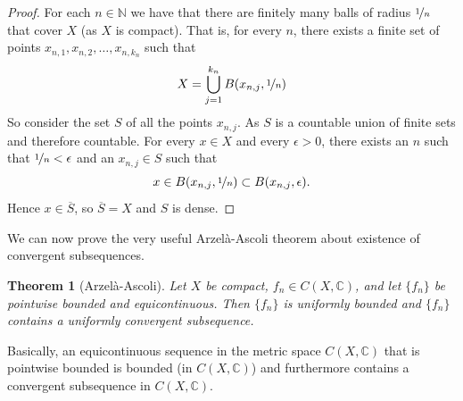 \documentclass[12pt]{book}
\newcommand{\C}{{\mathbb{C}}}
\newcommand{\N}{{\mathbb{N}}}
\theoremstyle{plain}
\newtheorem{thm}{Theorem}[section]
\theoremstyle{remark}
\theoremstyle{definition}
\theoremstyle{exercise}
\theoremstyle{example}
\begin{document}
\begin{proof}
For each $n \in \N$ we have that there are finitely many
balls of radius $\nicefrac{1}{n}$ that cover $X$ (as $X$ is compact). That is,
for every $n$, there exists
a finite set of points $x_{n,1},x_{n,2},\ldots,x_{n,k_n}$ such that
$$
X= \bigcup_{j=1}^{k_n} B(x_{n,j},\nicefrac{1}{n})
$$
So consider the set $S$ of all the points $x_{n,j}$.  As $S$ is a countable
union of finite sets and therefore countable.  For every $x \in X$
and every $\epsilon > 0$, there exists an $n$ such that
$\nicefrac{1}{n} < \epsilon$ and an $x_{n,j} \in S$ such that
$$
x \in B(x_{n,j},\nicefrac{1}{n}) \subset B(x_{n,j},\epsilon) .
$$
Hence $x \in \overline{S}$, so $\overline{S} = X$ and $S$ is dense.
\end{proof}

We can now prove the very useful Arzel\`a-Ascoli theorem about existence
of convergent subsequences.

\begin{thm}[Arzel\`a-Ascoli]
Let $X$ be compact, $f_n \in C(X,\C)$, and let $\{ f_n \}$
be pointwise bounded and equicontinuous.  Then
$\{f_n\}$ is uniformly bounded and $\{ f_n \}$ contains a uniformly
convergent subsequence.
\end{thm}

Basically, an equicontinuous sequence in the metric space
$C(X,\C)$ that is pointwise bounded
is bounded (in $C(X,\C)$) and furthermore contains a convergent
subsequence in $C(X,\C)$.
\end{document}
